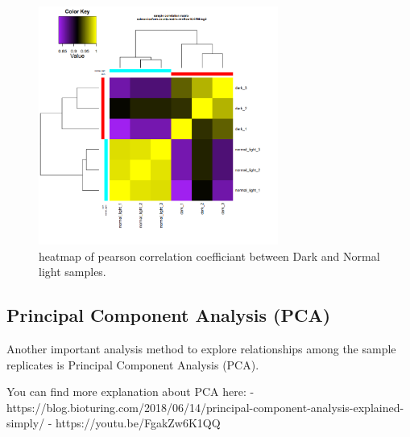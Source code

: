\documentclass[
  letterpaper,
  DIV=11,
  numbers=noendperiod]{scrreprt}
\begin{document}
\begin{figure}

{\centering \includegraphics[width=0.7\textwidth,height=\textheight]{assets/33_sample_corr.png}

}

\caption{heatmap of pearson correlation coefficiant between Dark and
Normal light samples.}

\end{figure}

\hypertarget{principal-component-analysis-pca}{%
\subsection{Principal Component Analysis
(PCA)}\label{principal-component-analysis-pca}}

Another important analysis method to explore relationships among the
sample replicates is Principal Component Analysis (PCA).

You can find more explanation about PCA here: -
https://blog.bioturing.com/2018/06/14/principal-component-analysis-explained-simply/
- https://youtu.be/FgakZw6K1QQ
\end{document}
